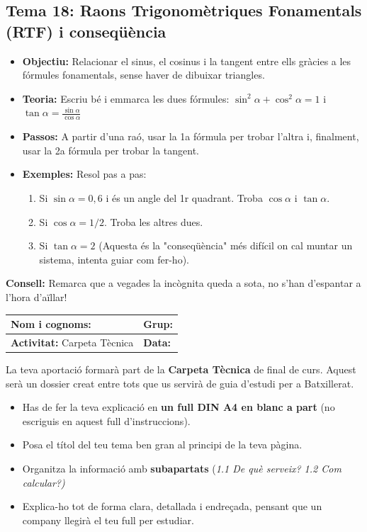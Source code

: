 \documentclass[12pt,a4paper]{article}
\newcommand{\introcomuna}{
    \begin{tcolorbox}[colback=gray!5,colframe=gray!50!black,title=\textbf{La Carpeta Tècnica de Matemàtiques}]
    La teva aportació formarà part de la \textbf{Carpeta Tècnica} de final de curs. Aquest serà un dossier creat entre tots que us servirà de guia d'estudi per a Batxillerat.
    
    \begin{itemize}[label=\textbullet, leftmargin=*]
        \item Has de fer la teva explicació en \textbf{un full DIN A4 en blanc a part} (no escriguis en aquest full d'instruccions).
        \item Posa el títol del teu tema ben gran al principi de la teva pàgina.
        \item Organitza la informació amb \textbf{subapartats} (\textit{1.1 De què serveix? 1.2 Com calcular?)}
        \item Explica-ho tot de forma clara, detallada i endreçada, pensant que un company llegirà el teu full per estudiar.
    \end{itemize}
    \end{tcolorbox}
    \vspace{0.1cm}
}
\newcommand{\capcaleraalumne}[1]{
    \begingroup
    \renewcommand{\arraystretch}{2.2}
    \begin{tabularx}{\textwidth}{|X|p{4cm}|}
    \hline
    \textbf{Nom i cognoms:} & \textbf{Grup:} \\ \hline
    \textbf{Activitat:} Carpeta Tècnica & \textbf{Data:} \\ \hline
    \end{tabularx}
    \endgroup
    \vspace{0.4cm}
}
\begin{document}
\subsection*{Tema 18: Raons Trigonomètriques Fonamentals (RTF) i conseqüència}
\begin{itemize}[label=\textbullet]
    \item \textbf{Objectiu:} Relacionar el sinus, el cosinus i la tangent entre ells gràcies a les fórmules fonamentals, sense haver de dibuixar triangles.
    \item \textbf{Teoria:} Escriu bé i emmarca les dues fórmules: 
    $\sin^2\alpha + \cos^2\alpha = 1$ \quad i \quad $\displaystyle \tan\alpha = \frac{\sin\alpha}{\cos\alpha}$
    \item \textbf{Passos:} A partir d'una raó, usar la 1a fórmula per trobar l'altra i, finalment, usar la 2a fórmula per trobar la tangent.
    \item \textbf{Exemples:} Resol pas a pas:
    \begin{enumerate}[label=\alph*)]
        \item Si $\sin\alpha = 0,6$ i és un angle del 1r quadrant. Troba $\cos\alpha$ i $\tan\alpha$.
        \item Si $\cos\alpha = 1/2$. Troba les altres dues.
        \item Si $\tan\alpha = 2$ (Aquesta és la "conseqüència" més difícil on cal muntar un sistema, intenta guiar com fer-ho).
    \end{enumerate}
\end{itemize}
\vfill
\noindent\textbf{Consell:} Remarca que a vegades la incògnita queda a sota, no s'han d'espantar a l'hora d'aïllar!

\newpage
\capcaleraalumne{19}
\introcomuna
\end{document}
